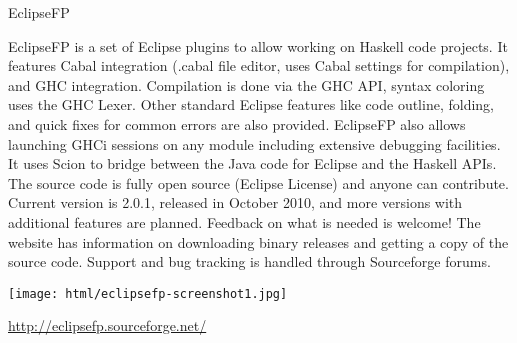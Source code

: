 \begin{hcarentry}[new]{EclipseFP}
\makeheader

EclipseFP is a set of Eclipse plugins to allow working on Haskell code projects.
It features Cabal integration (.cabal file editor, uses Cabal settings for compilation), and GHC integration. Compilation is done via the GHC API, syntax coloring uses the GHC Lexer. Other standard Eclipse features like code outline, folding, and quick fixes for common errors are also provided. EclipseFP also allows launching GHCi sessions on any module including extensive debugging facilities. It uses Scion to bridge between the Java code for Eclipse and the Haskell APIs.
The source code is fully open source (Eclipse License) and anyone can contribute. Current version is 2.0.1, released in October 2010, and more versions with additional features are planned. Feedback on what is needed is welcome! The website has information on downloading binary releases and getting a copy of the source code. Support and bug tracking is handled through Sourceforge forums.

\begin{center}
\texttt{[image: html/eclipsefp-screenshot1.jpg]}
\end{center}

\FurtherReading 
\url{http://eclipsefp.sourceforge.net/}
\end{hcarentry}
